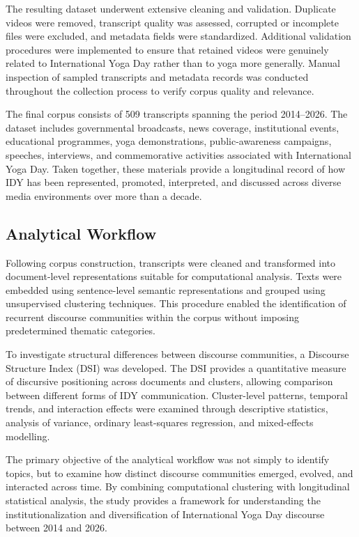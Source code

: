 \documentclass[11pt]{article}
\begin{document}
The resulting dataset underwent extensive cleaning and validation. Duplicate videos were removed, transcript quality was
assessed, corrupted or incomplete files were excluded, and metadata fields were standardized. Additional validation
procedures were implemented to ensure that retained videos were genuinely related to International Yoga Day rather than
to yoga more generally. Manual inspection of sampled transcripts and metadata records was conducted throughout the
collection process to verify corpus quality and relevance.


The final corpus consists of 509 transcripts spanning the period 2014--2026. The dataset includes governmental
broadcasts, news coverage, institutional events, educational programmes, yoga demonstrations, public-awareness
campaigns, speeches, interviews, and commemorative activities associated with International Yoga Day. Taken together,
these materials provide a longitudinal record of how IDY has been represented, promoted, interpreted, and discussed
across diverse media environments over more than a decade.


\subsection{Analytical Workflow}



Following corpus construction, transcripts were cleaned and transformed into document-level representations suitable for
computational analysis. Texts were embedded using sentence-level semantic representations and grouped using unsupervised
clustering techniques. This procedure enabled the identification of recurrent discourse communities within the corpus
without imposing predetermined thematic categories.


To investigate structural differences between discourse communities, a Discourse Structure Index (DSI) was developed.
The DSI provides a quantitative measure of discursive positioning across documents and clusters, allowing comparison
between different forms of IDY communication. Cluster-level patterns, temporal trends, and interaction effects were
examined through descriptive statistics, analysis of variance, ordinary least-squares regression, and mixed-effects
modelling.


The primary objective of the analytical workflow was not simply to identify topics, but to examine how distinct
discourse communities emerged, evolved, and interacted across time. By combining computational clustering with
longitudinal statistical analysis, the study provides a framework for understanding the institutionalization and
diversification of International Yoga Day discourse between 2014 and 2026.
\end{document}
